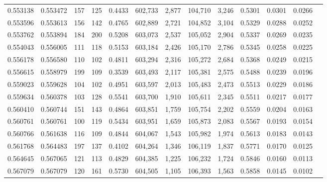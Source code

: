\begin{tabular}{rrrrrrrrrrrrr}
0.553138 & 0.553472 &   157 &   125 &                                     0.4433 & 602,733 &   2,877 & 104,710 &   3,246 & 0.5301 & 0.0301 & 0.0266 \\
0.553596 & 0.553613 &   156 &   142 &                                     0.4765 & 602,889 &   2,721 & 104,852 &   3,104 & 0.5329 & 0.0288 & 0.0252 \\
0.553762 & 0.553894 &   184 &   200 &                                     0.5208 & 603,073 &   2,537 & 105,052 &   2,904 & 0.5337 & 0.0269 & 0.0235 \\
0.554043 & 0.556005 &   111 &   118 &                                     0.5153 & 603,184 &   2,426 & 105,170 &   2,786 & 0.5345 & 0.0258 & 0.0225 \\
0.556178 & 0.556580 &   110 &   102 &                                     0.4811 & 603,294 &   2,316 & 105,272 &   2,684 & 0.5368 & 0.0249 & 0.0215 \\
0.556615 & 0.558979 &   199 &   109 &                                     0.3539 & 603,493 &   2,117 & 105,381 &   2,575 & 0.5488 & 0.0239 & 0.0196 \\
0.559023 & 0.559628 &   104 &   102 &                                     0.4951 & 603,597 &   2,013 & 105,483 &   2,473 & 0.5513 & 0.0229 & 0.0186 \\
0.559634 & 0.560378 &   103 &   128 &                                     0.5541 & 603,700 &   1,910 & 105,611 &   2,345 & 0.5511 & 0.0217 & 0.0177 \\
0.560410 & 0.560744 &   151 &   143 &                                     0.4864 & 603,851 &   1,759 & 105,754 &   2,202 & 0.5559 & 0.0204 & 0.0163 \\
0.560761 & 0.560761 &   100 &   119 &                                     0.5434 & 603,951 &   1,659 & 105,873 &   2,083 & 0.5567 & 0.0193 & 0.0154 \\
0.560766 & 0.561638 &   116 &   109 &                                     0.4844 & 604,067 &   1,543 & 105,982 &   1,974 & 0.5613 & 0.0183 & 0.0143 \\
0.561768 & 0.564483 &   197 &   137 &                                     0.4102 & 604,264 &   1,346 & 106,119 &   1,837 & 0.5771 & 0.0170 & 0.0125 \\
0.564645 & 0.567065 &   121 &   113 &                                     0.4829 & 604,385 &   1,225 & 106,232 &   1,724 & 0.5846 & 0.0160 & 0.0113 \\
0.567079 & 0.567079 &   120 &   161 &                                     0.5730 & 604,505 &   1,105 & 106,393 &   1,563 & 0.5858 & 0.0145 & 0.0102 \\

\end{tabular}
